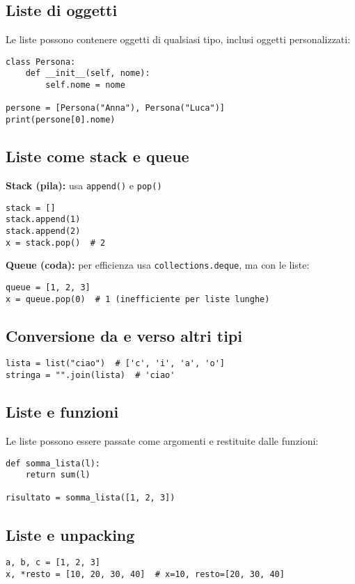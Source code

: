 \documentclass[a4paper,12pt]{article}
\begin{document}
\subsection*{Liste di oggetti}
Le liste possono contenere oggetti di qualsiasi tipo, inclusi oggetti personalizzati:
\begin{lstlisting}
class Persona:
    def __init__(self, nome):
        self.nome = nome

persone = [Persona("Anna"), Persona("Luca")]
print(persone[0].nome)
\end{lstlisting}

\subsection*{Liste come stack e queue}
\textbf{Stack (pila):} usa \texttt{append()} e \texttt{pop()}
\begin{lstlisting}
stack = []
stack.append(1)
stack.append(2)
x = stack.pop()  # 2
\end{lstlisting}
\textbf{Queue (coda):} per efficienza usa \texttt{collections.deque}, ma con le liste:
\begin{lstlisting}
queue = [1, 2, 3]
x = queue.pop(0)  # 1 (inefficiente per liste lunghe)
\end{lstlisting}

\subsection*{Conversione da e verso altri tipi}
\begin{lstlisting}
lista = list("ciao")  # ['c', 'i', 'a', 'o']
stringa = "".join(lista)  # 'ciao'
\end{lstlisting}

\subsection*{Liste e funzioni}
Le liste possono essere passate come argomenti e restituite dalle funzioni:
\begin{lstlisting}
def somma_lista(l):
    return sum(l)

risultato = somma_lista([1, 2, 3])
\end{lstlisting}

\subsection*{Liste e unpacking}
\begin{lstlisting}
a, b, c = [1, 2, 3]
x, *resto = [10, 20, 30, 40]  # x=10, resto=[20, 30, 40]
\end{lstlisting}
\end{document}
